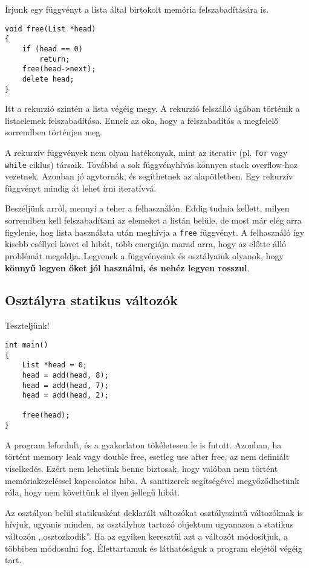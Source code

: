 \documentclass[a4paper,11.5pt,table]{article}
\begin{document}
	Írjunk egy függvényt a lista által birtokolt memória felszabadítására is.
	\begin{lstlisting}
void free(List *head)
{
	if (head == 0)
		return;
	free(head->next);
	delete head;
}
	\end{lstlisting}
	Itt a rekurzió szintén a lista végéig megy. A rekurzió felszálló ágában történik a listaelemek felszabadítása. Ennek az oka, hogy a felszabadítás a megfelelő sorrendben történjen meg.
	\begin{note}
		A rekurzív függvények nem olyan hatékonyak, mint az iterativ (pl. \texttt{for} vagy \texttt{while} ciklus) társaik. Továbbá a sok függvényhívás könnyen stack overflow-hoz vezetnek. Azonban jó agytornák, és segíthetnek az alapötletben. Egy rekurzív függvényt mindig át lehet írni iteratívvá.
	\end{note}
	Beszéljünk arról, mennyi a teher a felhasználón. Eddig tudnia kellett, milyen sorrendben kell felszabadítani az elemeket a listán belüle, de most már elég arra figylenie, hog lista használata után meghívja a \texttt{free} függvényt. A felhasználó így kisebb eséllyel követ el hibát, több energiája marad arra, hogy az előtte álló problémát megoldja. Legyenek a függvényeink és osztályaink olyanok, hogy \textbf{könnyű legyen őket jól használni, és nehéz legyen rosszul}.
	
	\subsection{Osztályra statikus változók}
	Teszteljünk!
	\begin{lstlisting}
int main()
{
	List *head = 0;
	head = add(head, 8);
	head = add(head, 7);
	head = add(head, 2);
	
	free(head);
}
	\end{lstlisting}
	A program lefordult, és a gyakorlaton tökéletesen le is futott. Azonban, ha történt memory leak vagy double free, esetleg use after free, az nem definiált viselkedés. Ezért nem lehetünk benne biztosak, hogy valóban nem történt memóriakezeléssel kapcsolatos hiba. A sanitizerek segítségével megyőződhetünk róla, hogy nem követtünk el ilyen jellegű hibát.
	
	\smallskip
	Az osztályon belül statikusként deklarált változókat osztályszintű változóknak is hívjuk, ugyanis minden, az osztályhoz tartozó objektum ugyanazon a statikus változón ,,osztozkodik''. Ha az egyiken keresztül azt a változót módosítjuk, a többiben módosulni fog. Élettartamuk és láthatóságuk a program elejétől végéig tart.
	
\end{document}
